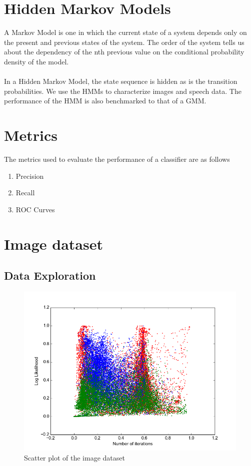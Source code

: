 \documentclass[11pt,a4paper]{article}
\begin{document}
\section{Hidden Markov Models}
A Markov Model is one in which the current state of a system depends only on the present and previous states of the system. The order of the system tells us about the dependency of the nth previous value on the conditional probability density of the model. \\ \\

In a Hidden Markov Model, the state sequence is hidden as is the transition probabilities. We use the HMMs to characterize images and speech data. The performance of the HMM is also benchmarked to that of a GMM.

\section{Metrics}
The metrics used to evaluate the performance of a classifier are as follows
\begin{enumerate}
\item Precision
\item Recall
\item ROC Curves
\end{enumerate}
\newpage
\section{Image dataset}
\subsection{Data Exploration}
\begin{figure}[H]
\includegraphics[width=.8\linewidth]{Figures/images_trainingdata_scatter.png}
\caption{Scatter plot of the image dataset}
\end{figure} 
\end{document}
